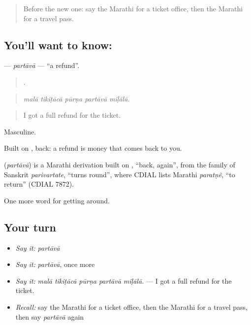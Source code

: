 \label{lesson:MR-C398-partava}



\begin{quote}
Before the new one: say the Marathi for a ticket office, then the Marathi for a travel pass.
\end{quote}

\subsection*{You'll want to know: }
\textbf{} — \emph{partāvā} — \textquotedblleft{}a refund\textquotedblright{}.

\begin{quote}
    .
\end{quote}

\begin{quote}
\emph{malā tikiṭācā pūrṇa partāvā miḷālā.}
\end{quote}

\begin{quote}
I got a full refund for the ticket.
\end{quote}

Masculine.

Built on , back: a refund is money that comes back to you.

\begin{cousinweb}
\textbf{} (\emph{partāvā}) is a Marathi derivation built on \textbf{}, \textquotedblleft{}back, again\textquotedblright{}, from the family of Sanskrit \emph{parivartate}, \textquotedblleft{}turns round\textquotedblright{}, where CDIAL lists Marathi \emph{paratṇẽ}, \textquotedblleft{}to return\textquotedblright{} (CDIAL 7872).
\end{cousinweb}

\begin{grammarlens}[title={What you've built}]
One more word for getting around.
\end{grammarlens}

\subsection*{Your turn}
\begin{itemize}
\raggedright
  \item \emph{Say it:} \emph{partāvā}
  \item \emph{Say it:} \emph{partāvā}, once more
  \item \emph{Say it:} \emph{malā tikiṭācā pūrṇa partāvā miḷālā.} — I got a full refund for the ticket.
  \item \emph{Recall:} say the Marathi for a ticket office, then the Marathi for a travel pass, then say \emph{partāvā} again
\end{itemize}

